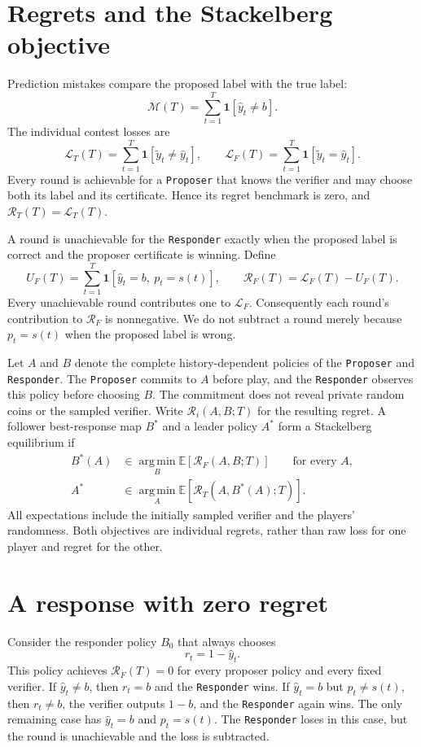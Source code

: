 \documentclass[11pt]{article}
\newcommand{\Lo}{\mathcal L}
\renewcommand{\Re}{\mathcal R}
\newcommand{\Mi}{\mathcal M}
\newcommand{\hy}{\hat y}
\newcommand{\vy}{\tilde y}
\newcommand{\ind}{\mathbf 1}
\newcommand{\dt}{\texttt{Proposer}\xspace}
\newcommand{\df}{\texttt{Responder}\xspace}
\begin{document}
\section{Regrets and the Stackelberg objective}

Prediction mistakes compare the proposed label with the true label:
\[
\Mi(T)=\sum_{t=1}^T\ind[\hy_t\ne b].
\]
The individual contest losses are
\[
\Lo_T(T)=\sum_{t=1}^T\ind[\vy_t\ne\hy_t],
\qquad
\Lo_F(T)=\sum_{t=1}^T\ind[\vy_t=\hy_t].
\]
Every round is achievable for a \dt that knows the verifier and may choose
both its label and its certificate. Hence its regret benchmark is zero,
and $\Re_T(T)=\Lo_T(T)$.

A round is unachievable for the \df exactly when the proposed label is
correct and the proposer certificate is winning. Define
\[
U_F(T)=\sum_{t=1}^T\ind[\hy_t=b,\ p_t=s(t)],
\qquad
\Re_F(T)=\Lo_F(T)-U_F(T).
\]
Every unachievable round contributes one to $\Lo_F$. Consequently each
round's contribution to $\Re_F$ is nonnegative. We do not subtract a round
merely because $p_t=s(t)$ when the proposed label is wrong.

Let $A$ and $B$ denote the complete history-dependent policies of the \dt
and \df. The \dt commits to $A$ before play, and the \df observes this
policy before choosing $B$. The commitment does not reveal private random
coins or the sampled verifier. Write $\Re_i(A,B;T)$ for the resulting
regret. A follower best-response map $B^*$ and a leader policy $A^*$ form
a Stackelberg equilibrium if
\begin{align*}
B^*(A)&\in\operatorname*{arg\,min}_{B}
    \mathbb E[\Re_F(A,B;T)] \qquad\text{for every }A,\\
A^*&\in\operatorname*{arg\,min}_{A}
    \mathbb E[\Re_T(A,B^*(A);T)].
\end{align*}
All expectations include the initially sampled verifier and the players'
randomness. Both objectives are individual regrets, rather than raw
loss for one player and regret for the other.

\section{A response with zero regret}

Consider the responder policy $B_0$ that always chooses
\[
r_t=1-\hy_t.
\]
This policy achieves $\Re_F(T)=0$ for every proposer policy and every fixed
verifier. If $\hy_t\ne b$, then $r_t=b$ and the \df wins. If $\hy_t=b$
but $p_t\ne s(t)$, then $r_t\ne b$, the verifier outputs $1-b$, and the
\df again wins. The only remaining case has $\hy_t=b$ and $p_t=s(t)$.
The \df loses in this case, but the round is unachievable and the loss is
subtracted.
\end{document}
